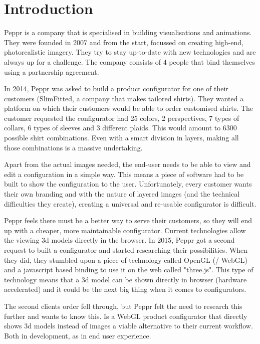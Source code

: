 \chapter{Introduction}

Peppr is a company that is specialised in building visualisations and animations. They were founded in 2007 and from the start, focussed on creating high-end, photorealistic imagery. They try to stay up-to-date with new technologies and are always up for a challenge. The company consists of 4 people that bind themselves using a partnership agreement.

In 2014, Peppr was asked to build a product configurator for one of their customers (SlimFitted, a company that makes tailored shirts). They wanted a platform on which their customers would be able to order customised shirts. The customer requested the configurator had 25 colors, 2 perspectives, 7 types of collars, 6 types of sleeves and 3 different plaids. This would amount to 6300 possible shirt combinations. Even with a smart division in layers, making all those combinations is a massive undertaking.

Apart from the actual images needed, the end-user needs to be able to view and edit a configuration in a simple way. This means a piece of software had to be built to show the configuration to the user. Unfortunately, every customer wants their own branding and with the nature of layered images (and the technical difficulties they create), creating a universal and re-usable configurator is difficult.

Peppr feels there must be a better way to serve their customers, so they will end up with a cheaper, more maintainable configurator. Current technologies allow the viewing 3d models directly in the browser. In 2015, Peppr got a second request to built a configurator and started researching their possibilities. When they did, they stumbled upon a piece of technology called OpenGL (/ WebGL) and a javascript based binding to use it on the web called "three.js". This type of technology means that a 3d model can be shown directly in browser (hardware accelerated) and it could be the next big thing when it comes to configurators.

The second clients order fell through, but Peppr felt the need to research this further and wants to know this. Is a WebGL product configurator that directly shows 3d models instead of images a viable alternative to their current workflow. Both in development, as in end user experience.






